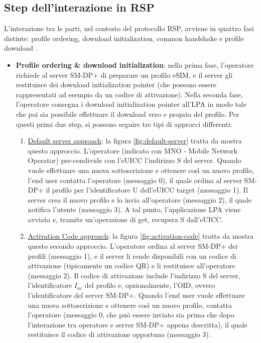 \documentclass[10pt, oneside]{book}
\begin{document}
\subsection{Step dell'interazione in RSP}\label{sec:step-RSP}
L'interazione tra le parti, nel contesto del protocollo RSP, avviene in quattro fasi distinte: profile ordering, download initialization, common handshake e profile download \cite{Sec-analysis}.
\begin{itemize}
\item \textbf{Profile ordering \& download initialization}: nella prima fase, l'operatore richiede al server SM-DP+ di preparare un profilo eSIM, e il server gli restituisce dei download initialization pointer (che possono essere rappresentati ad esempio da un codice di attivazione). Nella seconda fase, l'operatore consegna i download initialization pointer all'LPA in modo tale che poi sia possibile effettuare il download vero e proprio del profilo. Per questi primi due step, si possono seguire tre tipi di approcci differenti:
\begin{enumerate}
\item \underline{Default server approach}: la figura \ref{fig:default-server} tratta da \cite{Sec-analysis} mostra questo approccio. L'operatore (indicato con MNO - Mobile Network Operator) pre-condivide con l'eUICC l'indirizzo S del server. Quando vuole effettuare una nuova sottoscrizione e ottenere così un nuovo profilo, l'end user contatta l'operatore (messaggio 0), il quale ordina al server SM-DP+ il profilo per l'identificatore U dell'eUICC target (messaggio 1). Il server crea il nuovo profilo e lo invia all'operatore (messaggio 2), il quale notifica l'utente (messaggio 3). A tal punto, l'applicazione LPA viene avviata e, tramite un'operazione di get, recupera S dall'eUICC.
\item \underline{Activation Code approach}: la figura \ref{fig:activation-code} tratta da \cite{Sec-analysis} mostra questo secondo approccio. L'operatore ordina al server SM-DP+ dei profili (messaggio 1), e il server li rende disponibili con un codice di attivazione (tipicamente un codice QR) e li restituisce all'operatore (messaggio 2). Il codice di attivazione include l'indirizzo S del server, l'identificatore $I_{ac}$ del profilo e, opzionalmente, l'OID, ovvero l'identificatore del server SM-DP+. Quando l'end user vuole effettuare una nuova sottoscrizione e ottenere così un nuovo profilo, contatta l'operatore (messaggio 0, che può essere inviato sia prima che dopo l'interazione tra operatore e server SM-DP+ appena descritta), il quale restituisce il codice di attivazione opportuno (messaggio 3).

\end{enumerate}
\end{itemize}
\end{document}
